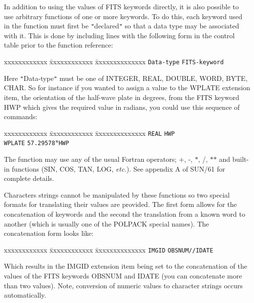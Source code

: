 \documentclass[twoside,11pt]{article}
\newcommand{\xref}[3]{#1}
\renewcommand{\_}{\texttt{\symbol{95}}}
\begin{document}
{{      In addition to using the values of FITS keywords directly, it is also
      possible to use arbitrary functions of one or more keywords. To do
      this, each keyword used in the function must first be {\tt "}declared{\tt "} so
      that a data type may be associated with it. This is done by including
      lines with the following form in the control table prior to the
      function reference:

\begin{tabbing}
 xxxxxxxxxxxx \= xxxxxxxxxxxx            \= xxxxxxxxxxxxxx \kill
              \>  \texttt{Data-type}        \> \texttt{FITS-keyword}  
\end{tabbing}

      Here {\tt "}Data-type{\tt "} must be one of \_INTEGER, \_REAL, \_DOUBLE, \_WORD, \_BYTE,
      \_CHAR. So for instance if you wanted to assign a value to the WPLATE
      extension item, the orientation of the half-wave plate in degrees, from
      the FITS keyword HWP which gives the required value in radians, you
      could use this sequence of commands:

\begin{tabbing}
 xxxxxxxxxxxx \= xxxxxxxxxxxx            \= xxxxxxxxxxxxxx \kill
              \>  \texttt{\_REAL}        \> \texttt{HWP}  \\
              \>  \texttt{WPLATE}        \> \texttt{57.29578$*$HWP}  
\end{tabbing}

      The function may use any of the usual Fortran operators; $+$, -, $*$, /,
      $*$$*$ and built-in functions (SIN, COS, TAN, LOG, \emph{etc.}). See
      \xref{appendix A}{sun61}{appendix_transformation_functions} of 
      \xref{SUN/61}{sun61}{} for complete details.

      Characters strings cannot be manipulated by these functions so two
      special formats for translating their values are provided.
      The first form allows for the concatenation of keywords and
      the second the translation from a known word to another
      (which is usually one of the POLPACK special names). The
      concatenation form looks like:

\begin{tabbing}
 xxxxxxxxxxxx \= xxxxxxxxxxxx            \= xxxxxxxxxxxxxx \kill
              \>  \texttt{IMGID}        \> \texttt{OBSNUM//IDATE}  
\end{tabbing}

      Which results in the IMGID extension item being set to the
      concatenation of the values of the FITS keywords OBSNUM and
      IDATE (you can concatenate more than two values). Note, conversion
      of numeric values to character strings occurs automatically.

}}
\end{document}
